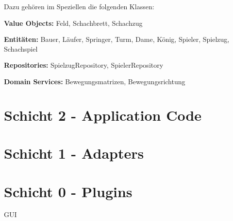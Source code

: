 Dazu gehören im Speziellen die folgenden Klassen:

\textbf{Value Objects:} Feld, Schachbrett, Schachzug

\textbf{Entitäten:} Bauer, Läufer, Springer, Turm, Dame, König, Spieler, Spielzug, Schachspiel

\textbf{Repositories:} SpielzugRepository, SpielerRepository

\textbf{Domain Services:} Bewegungsmatrizen, Bewegungsrichtung

\section*{Schicht 2 - Application Code}

\section*{Schicht 1 - Adapters}

\section*{Schicht 0 - Plugins}

GUI
